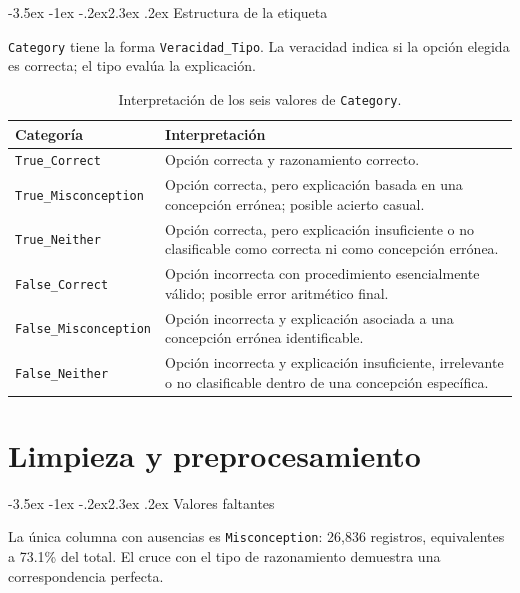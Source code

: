\documentclass[11pt,oneside,openany]{book}
\makeatletter
\renewcommand\section{\@startsection{section}{1}{\z@}%
  {-3.5ex \@plus -1ex \@minus -.2ex}{2.3ex \@plus .2ex}%
  {\normalfont\Large\sffamily\bfseries\color{AzulMedio}}}
\newcommand{\codigo}[1]{\texttt{#1}}
\makeatother
\begin{document}
\section{Estructura de la etiqueta}

\codigo{Category} tiene la forma \codigo{Veracidad\_Tipo}. La veracidad indica
si la opción elegida es correcta; el tipo evalúa la explicación.

\begin{table}[htbp]
\centering
\caption{Interpretación de los seis valores de \codigo{Category}.}
\label{tab:interpretacion-category}
\begin{tabularx}{\textwidth}{@{}p{4.1cm}Y@{}}
\toprule
\textbf{Categoría} & \textbf{Interpretación}\\
\midrule
\codigo{True\_Correct} & Opción correcta y razonamiento correcto.\\
\codigo{True\_Misconception} & Opción correcta, pero explicación basada en una
concepción errónea; posible acierto casual.\\
\codigo{True\_Neither} & Opción correcta, pero explicación insuficiente o no
clasificable como correcta ni como concepción errónea.\\
\codigo{False\_Correct} & Opción incorrecta con procedimiento esencialmente
válido; posible error aritmético final.\\
\codigo{False\_Misconception} & Opción incorrecta y explicación asociada a una
concepción errónea identificable.\\
\codigo{False\_Neither} & Opción incorrecta y explicación insuficiente, irrelevante
o no clasificable dentro de una concepción específica.\\
\bottomrule
\end{tabularx}
\end{table}

\chapter{Limpieza y preprocesamiento}

\section{Valores faltantes}

La única columna con ausencias es \codigo{Misconception}: 26,836 registros,
equivalentes a 73.1\% del total. El cruce con el tipo de razonamiento demuestra
una correspondencia perfecta.
\end{document}
